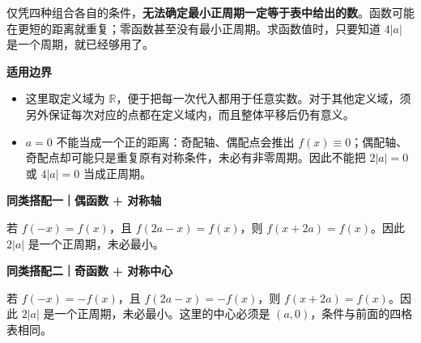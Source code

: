 \begin{statementbox}
仅凭四种组合各自的条件，\textbf{无法确定最小正周期一定等于表中给出的数}。函数可能在更短的距离就重复；零函数甚至没有最小正周期。求函数值时，只要知道 $4|a|$ 是一个周期，就已经够用了。

\medskip
\textbf{\textcolor{CStatement}{适用边界}}
\begin{itemize}[leftmargin=*,itemsep=0.25em]
  \item 这里取定义域为 $\mathbb{R}$，便于把每一次代入都用于任意实数。对于其他定义域，须另外保证每次对应的点都在定义域内，而且整体平移后仍有意义。
  \item $a=0$ 不能当成一个正的距离：奇配轴、偶配点会推出 $f(x)\equiv0$；偶配轴、奇配点却可能只是重复原有对称条件，未必有非零周期。因此不能把 $2|a|=0$ 或 $4|a|=0$ 当成正周期。
\end{itemize}
\end{statementbox}
\clearpage
\begin{statementbox}
\textbf{同类搭配一｜偶函数 + 对称轴}


若 $f(-x)=f(x)$，且 $f(2a-x)=f(x)$，则 $f(x+2a)=f(x)$。因此 $2|a|$ 是一个正周期，未必最小。

\end{statementbox}
\clearpage
\begin{statementbox}
\textbf{同类搭配二｜奇函数 + 对称中心}


若 $f(-x)=-f(x)$，且 $f(2a-x)=-f(x)$，则 $f(x+2a)=f(x)$。因此 $2|a|$ 是一个正周期，未必最小。这里的中心必须是 $(a,0)$，条件与前面的四格表相同。

\end{statementbox}
